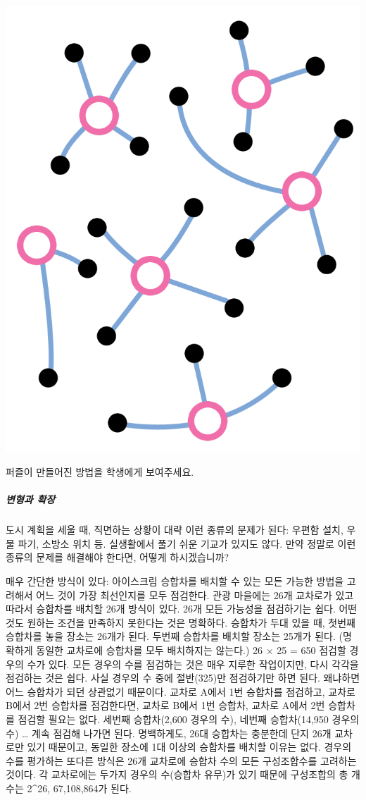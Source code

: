 \documentclass[]{article}
\begin{document}
\includegraphics{csunplugged/04-part/img/ch15-dominating-sets/14-dominating-sets-03-icecream-vans-sol.png}

퍼즐이 만들어진 방법을 학생에게 보여주세요.

\subparagraph{변형과 확장}\label{section-207}

도시 계획을 세울 때, 직면하는 상황이 대략 이런 종류의 문제가 된다:
우편함 설치, 우물 파기, 소방소 위치 등. 실생활에서 풀기 쉬운 기교가
있지도 않다. 만약 정말로 이런 종류의 문제를 해결해야 한다면, 어떻게
하시겠습니까?

매우 간단한 방식이 있다: 아이스크림 승합차를 배치할 수 있는 모든 가능한
방법을 고려해서 어느 것이 가장 최선인지를 모두 점검한다. 관광 마을에는
26개 교차로가 있고 따라서 승합차를 배치할 26개 방식이 있다. 26개 모든
가능성을 점검하기는 쉽다. 어떤 것도 원하는 조건을 만족하지 못한다는 것은
명확하다. 승합차가 두대 있을 때, 첫번째 승합차를 놓을 장소는 26개가
된다. 두번째 승합차를 배치할 장소는 25개가 된다. (명확하게 동일한
교차로에 승합차를 모두 배치하지는 않는다.) 26 × 25 = 650 점검할 경우의
수가 있다. 모든 경우의 수를 점검하는 것은 매우 지루한 작업이지만, 다시
각각을 점검하는 것은 쉽다. 사실 경우의 수 중에 절반(325)만 점검하기만
하면 된다. 왜냐하면 어느 승합차가 되던 상관없기 때문이다. 교차로 A에서
1번 승합차를 점검하고, 교차로 B에서 2번 승합차를 점검한다면, 교차로
B에서 1번 승합차, 교차로 A에서 2번 승합차를 점검할 필요는 없다. 세번째
승합차(2,600 경우의 수), 네번째 승합차(14,950 경우의 수) \ldots{} 계속
점검해 나가면 된다. 명백하게도, 26대 승합차는 충분한데 단지 26개
교차로만 있기 때문이고, 동일한 장소에 1대 이상의 승합차를 배치할 이유는
없다. 경우의 수를 평가하는 또다른 방식은 26개 교차로에 승합차 수의 모든
구성조합수를 고려하는 것이다. 각 교차로에는 두가지 경우의 수(승합차
유무)가 있기 때문에 구성조합의 총 개수는 2\^{}26, 67,108,864가 된다.
\end{document}
